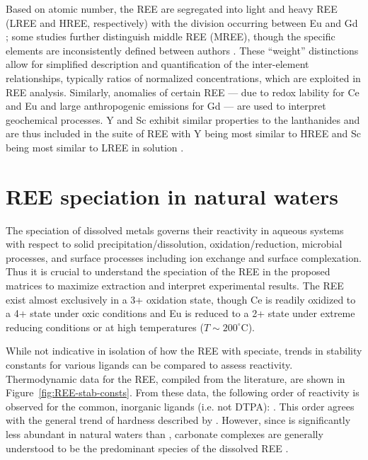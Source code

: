 Based on atomic number, the REE are segregated into light and heavy REE (LREE and HREE, respectively) with the division occurring between Eu and Gd \citep{CastorHedrick};
some studies further distinguish middle REE (MREE), though the specific elements are inconsistently defined between authors \citep{Hannigan_CG_2001, Tang_CG_2010, Choi_CG_2009}.
These ``weight'' distinctions allow for simplified description and quantification of the inter-element relationships, typically ratios of normalized concentrations, which are exploited in REE analysis.
Similarly, anomalies of certain REE --- due to redox lability for Ce and Eu \citep{Brookins_RMG_1989} and large anthropogenic emissions for Gd \citep{Bau_EPSL_1996} --- are used to interpret geochemical processes.
Y and Sc exhibit similar properties to the lanthanides and are thus included in the suite of REE with Y being most similar to HREE and Sc being most similar to LREE in solution \citep{Brookins_RMG_1989}.

\section{REE speciation in natural waters}

The speciation of dissolved metals governs their reactivity in aqueous systems with respect to solid precipitation/dissolution, oxidation/reduction, microbial processes, and surface processes including ion exchange and surface complexation.
Thus it is crucial to understand the speciation of the REE in the proposed matrices to maximize extraction and interpret experimental results.
The REE exist almost exclusively in a 3+ oxidation state, though Ce is readily oxidized to a 4+ state under oxic conditions and Eu is reduced to a 2+ state under extreme reducing conditions or at high temperatures ($T \sim 200^\circ$C).

While not indicative in isolation of how the REE with speciate, trends in stability constants for various ligands can be compared to assess reactivity.
Thermodynamic data for the REE, compiled from the literature, are shown in Figure~\ref{fig:REE-stab-consts}.
From these data, the following order of reactivity is observed for the common, inorganic ligands (i.e. not DTPA): .
This order agrees with the general trend of hardness described by \citet{Pearson_JACS_1963}.
However, since  is significantly less abundant in natural waters than , carbonate complexes are generally understood to be the predominant species of the dissolved REE \citep{Johannesson_LO_1994, Johannesson_AG_1995}.

